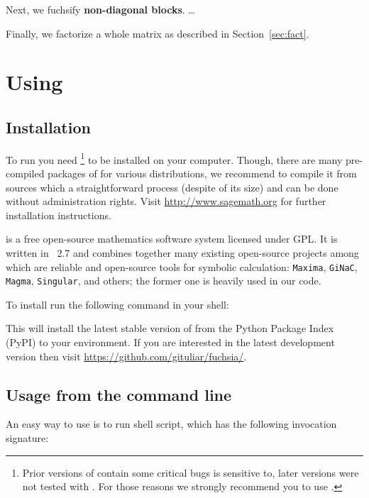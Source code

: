 \documentclass[12pt,a4paper]{article}
\begin{document}
Next, we fuchsify {\bf non-diagonal blocks}.
\ldots

Finally, we factorize a whole matrix as described in Section~\ref{sec:fact}.


\section{Using \fuchsia}
\label{sec:3}

\subsection{Installation}

To run \fuchsia you need \footnote{Prior versions of \sage contain some critical bugs \fuchsia is sensitive to, later versions were not tested with \fuchsia.
For those reasons we strongly recommend you to use .} to be installed on your computer.
Though, there are many pre-compiled packages of \sage for various \linux distributions, we recommend to compile it from sources which a straightforward process (despite of its size) and can be done without administration rights.
Visit \url{http://www.sagemath.org} for further installation instructions.

\sage is a free open-source mathematics software system licensed under GPL.
It is written in \python~2.7 and combines together many existing open-source projects among which are reliable and open-source tools for symbolic calculation: \texttt{Maxima}, \texttt{GiNaC}, \texttt{Magma}, \texttt{Singular}, and others; the former one is heavily used in our code.

To install \fuchsia run the following command in your shell:


This will install the latest stable version of \fuchsia from the Python Package Index (PyPI) to your \sage environment.
If you are interested in the latest development version then visit \url{https://github.com/gituliar/fuchsia/}.

\subsection{Usage from the command line}

An easy way to use \fuchsia is to run  shell script, which has the following invocation signature:

\end{document}
